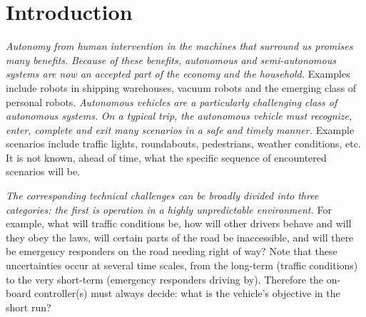 \section{Introduction}
\label{introduction}

{\it Autonomy from human intervention in the machines that surround us promises many benefits.}
{\it Because of these benefits, autonomous and semi-autonomous systems are now an accepted part of the economy and the household.}
Examples include robots in shipping warehouses, vacuum robots and the emerging class of personal robots.
{\it Autonomous vehicles are a particularly challenging class of autonomous systems.}
{\it On a typical trip, the autonomous vehicle must recognize, enter, complete and exit many scenarios in a safe and timely manner.} 
	Example scenarios include traffic lights, roundabouts, pedestrians, weather conditions, etc. 
It is not known, ahead of time, what the specific sequence of encountered scenarios will be.

{\it The corresponding technical challenges can be broadly divided into three categories: the first is operation in a highly unpredictable environment.}
For example, what will traffic conditions be, how will other drivers behave and will they obey the laws, will certain parts of the road be inaccessible, and will there be emergency responders on the road needing right of way? 
Note that these uncertainties occur at several time scales, from the long-term (traffic conditions) to the very short-term (emergency responders driving by).
Therefore the on-board controller(s) must always decide: what is the vehicle's objective in the short run?

